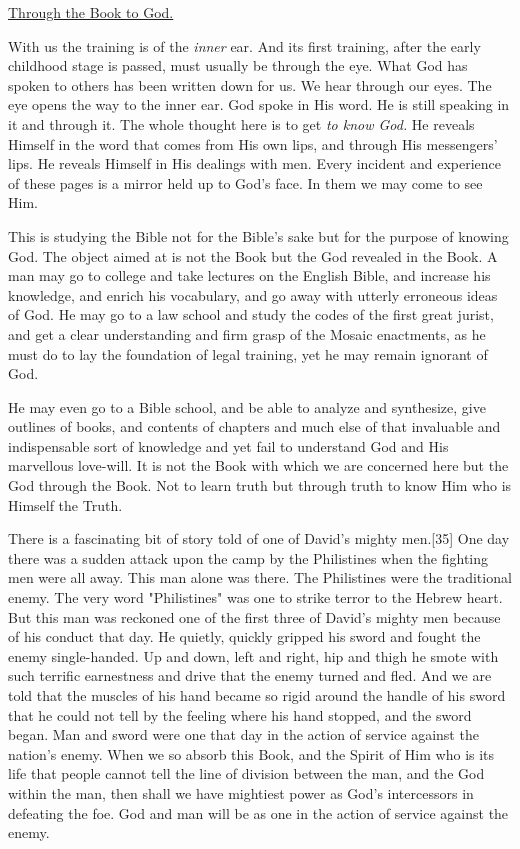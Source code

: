 \underline{Through the Book to God.}


With us the training is of the \textit{inner} ear. And its first training, after
the early childhood stage is passed, must usually be through the eye. What
God has spoken to others has been written down for us. We hear through our
eyes. The eye opens the way to the inner ear. God spoke in His word. He is
still speaking in it and through it. The whole thought here is to get \textit{to
know God.} He reveals Himself in the word that comes from His own lips,
and through His messengers' lips. He reveals Himself in His dealings with
men. Every incident and experience of these pages is a mirror held up to
God's face. In them we may come to see Him.

This is studying the Bible not for the Bible's sake but for the purpose of
knowing God. The object aimed at is not the Book but the God revealed in
the Book. A man may go to college and take lectures on the English Bible,
and increase his knowledge, and enrich his vocabulary, and go away with
utterly erroneous ideas of God. He may go to a law school and study the
codes of the first great jurist, and get a clear understanding and firm
grasp of the Mosaic enactments, as he must do to lay the foundation of
legal training, yet he may remain ignorant of God.

He may even go to a Bible school, and be able to analyze and synthesize,
give outlines of books, and contents of chapters and much else of that
invaluable and indispensable sort of knowledge and yet fail to understand
God and His marvellous love-will. It is not the Book with which we are
concerned here but the God through the Book. Not to learn truth but
through truth to know Him who is Himself the Truth.

There is a fascinating bit of story told of one of David's mighty men.[35]
One day there was a sudden attack upon the camp by the Philistines when
the fighting men were all away. This man alone was there. The Philistines
were the traditional enemy. The very word "Philistines" was one to strike
terror to the Hebrew heart. But this man was reckoned one of the first
three of David's mighty men because of his conduct that day. He quietly,
quickly gripped his sword and fought the enemy single-handed. Up and down,
left and right, hip and thigh he smote with such terrific earnestness and
drive that the enemy turned and fled. And we are told that the muscles of
his hand became so rigid around the handle of his sword that he could not
tell by the feeling where his hand stopped, and the sword began. Man and
sword were one that day in the action of service against the nation's
enemy. When we so absorb this Book, and the Spirit of Him who is its life
that people cannot tell the line of division between the man, and the God
within the man, then shall we have mightiest power as God's intercessors
in defeating the foe. God and man will be as one in the action of service
against the enemy.



